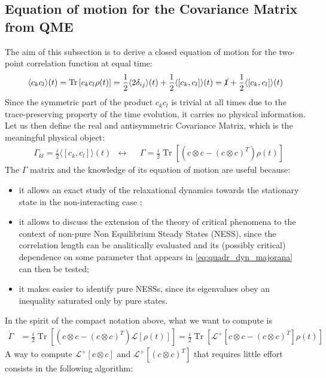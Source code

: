 \documentclass[a4paper,11pt]{article}
\DeclareMathOperator{\Tr}{Tr}
\theoremstyle{remark}
\newcommand{\mean}[1]{\ensuremath{\langle #1 \rangle}}
\newcommand{\ro}{\rho}
\newcommand{\nl}{\vskip 0.3cm}
\begin{document}
  \subsection{Equation of motion for the Covariance Matrix from QME}
  The aim of this subsection is to derive a closed equation of motion for the two-point correlation function at equal time: \begin{equation*}
  \mean{c_kc_l}(t)=\Tr\left[c_kc_l\ro(t)\right]=\frac{1}{2}\mean{2\delta_{ij}}(t)+\frac{1}{2}\mean{[c_k,c_l]}(t)=\cancel{1}+\frac{1}{2}\mean{[c_k,c_l]}(t)
  \end{equation*}
  Since the symmetric part of the product $c_kc_l$ is trivial at all times due to the trace-preserving property of the time evolution, it carries no physical information. Let us then define the real and antisymmetric Covariance Matrix, which is the meaningful physical object:
  \begin{align}
   &\Gamma_{kl}=\frac{i}{2}\mean{\left[c_k,c_l\right]}(t) &  \longleftrightarrow & & \Gamma = \frac{i}{2}\Tr\left[\left(c\otimes c - (c\otimes c)^T\right)\ro(t)\right]
   \label{eq:def_covariance}
  \end{align}
  The $\Gamma$ matrix and the knowledge of its equation of motion are useful because:
  \begin{itemize}
   \item it allows an exact study of the relaxational dynamics towards the stationary state in the non-interacting case \cite{Eisert2010};
   \item it allows to discuss the extension of the theory of critical phenomena to the context of non-pure Non Equilibrium Steady States (NESS), since the correlation length can be analitically evaluated and its (possibly critical) dependence on some parameter that appears in \ref{eq:quadr_dyn_majorana} can then be tested;
   \item it makes easier to identify pure NESSs, since its eigenvalues obey an inequality saturated only by pure states.\nl
  \end{itemize}
  In the spirit of the compact notation above, what we want to compute is
  \begin{align*}
   \dot{\Gamma} &=  \frac{i}{2}\Tr\left[\left(c\otimes c - (c\otimes c)^T\right)\mathcal{L}\left[\ro(t)\right]\right]=  \frac{i}{2}\Tr\left[\mathcal{L}^+\!\!\left[c\otimes c - (c\otimes c)^T\right]\ro(t)\right]
  \end{align*}
  A way to compute  $\mathcal{L}^+\!\!\left[c\otimes c\right]$ and $\mathcal{L}^+\!\!\left[ (c\otimes c)^T\right]$ that requires little effort consists in the following algorithm:
\end{document}
